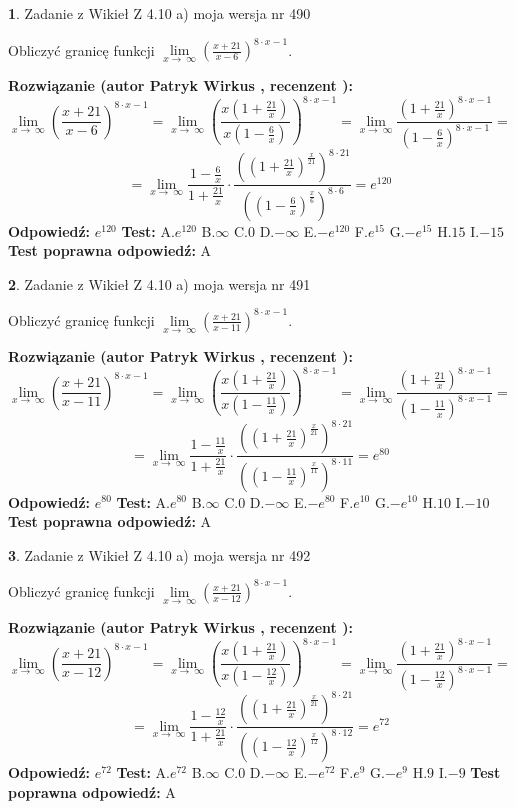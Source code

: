 \documentclass[12pt, a4paper]{article}
\theoremstyle{definition} %
\newtheorem{zad}{}
\newcommand{\zadStart}[1]{\begin{zad}#1\newline}
\newcommand{\zadStop}{\end{zad}}
\newcommand{\rozwStart}[2]{\noindent \textbf{Rozwiązanie (autor #1 , recenzent #2): }\newline}
\newcommand{\rozwStop}{\newline}
\newcommand{\odpStart}{\noindent \textbf{Odpowiedź:}\newline}
\newcommand{\odpStop}{\newline}
\newcommand{\testStart}{\noindent \textbf{Test:}\newline}
\newcommand{\testStop}{\newline}
\newcommand{\kluczStart}{\noindent \textbf{Test poprawna odpowiedź:}\newline}
\newcommand{\kluczStop}{\newline}
\begin{document}
\zadStart{Zadanie z Wikieł Z 4.10 a) moja wersja nr 490}

Obliczyć granicę funkcji  $\lim\limits_{x\to\ \infty}(\frac{x+21}{x-6})^{8\cdot x-1}$.
\zadStop
\rozwStart{Patryk Wirkus}{}
$$\lim\limits_{x\to\ \infty}(\frac{x+21}{x-6})^{8\cdot x-1} = \lim\limits_{x\to\ \infty}(\frac{x(1+\frac{21}{x})}{x(1-\frac{6}{x})})^{8\cdot x-1}=\lim\limits_{x\to\ \infty}\frac{(1+\frac{21}{x})^{8\cdot x-1}}{(1-\frac{6}{x})^{8\cdot x-1}}=$$
$$=\lim\limits_{x\to\ \infty}\frac{1-\frac{6}{x}}{1+\frac{21}{x}}\cdot\frac{((1+\frac{21}{x})^{\frac{x}{21}})^{8\cdot21}}{((1-\frac{6}{x})^{\frac{x}{6}})^{8\cdot6}}=e^{120}$$
\rozwStop
\odpStart
$e^{120}$
\odpStop
\testStart
A.$e^{120}$ B.$\infty$ C.$0$ D.$-\infty$ E.$-e^{120}$
F.$e^{15}$ G.$-e^{15}$
H.$15$
I.$-15$
\testStop
\kluczStart
A
\kluczStop



\zadStart{Zadanie z Wikieł Z 4.10 a) moja wersja nr 491}

Obliczyć granicę funkcji  $\lim\limits_{x\to\ \infty}(\frac{x+21}{x-11})^{8\cdot x-1}$.
\zadStop
\rozwStart{Patryk Wirkus}{}
$$\lim\limits_{x\to\ \infty}(\frac{x+21}{x-11})^{8\cdot x-1} = \lim\limits_{x\to\ \infty}(\frac{x(1+\frac{21}{x})}{x(1-\frac{11}{x})})^{8\cdot x-1}=\lim\limits_{x\to\ \infty}\frac{(1+\frac{21}{x})^{8\cdot x-1}}{(1-\frac{11}{x})^{8\cdot x-1}}=$$
$$=\lim\limits_{x\to\ \infty}\frac{1-\frac{11}{x}}{1+\frac{21}{x}}\cdot\frac{((1+\frac{21}{x})^{\frac{x}{21}})^{8\cdot21}}{((1-\frac{11}{x})^{\frac{x}{11}})^{8\cdot11}}=e^{80}$$
\rozwStop
\odpStart
$e^{80}$
\odpStop
\testStart
A.$e^{80}$ B.$\infty$ C.$0$ D.$-\infty$ E.$-e^{80}$
F.$e^{10}$ G.$-e^{10}$
H.$10$
I.$-10$
\testStop
\kluczStart
A
\kluczStop



\zadStart{Zadanie z Wikieł Z 4.10 a) moja wersja nr 492}

Obliczyć granicę funkcji  $\lim\limits_{x\to\ \infty}(\frac{x+21}{x-12})^{8\cdot x-1}$.
\zadStop
\rozwStart{Patryk Wirkus}{}
$$\lim\limits_{x\to\ \infty}(\frac{x+21}{x-12})^{8\cdot x-1} = \lim\limits_{x\to\ \infty}(\frac{x(1+\frac{21}{x})}{x(1-\frac{12}{x})})^{8\cdot x-1}=\lim\limits_{x\to\ \infty}\frac{(1+\frac{21}{x})^{8\cdot x-1}}{(1-\frac{12}{x})^{8\cdot x-1}}=$$
$$=\lim\limits_{x\to\ \infty}\frac{1-\frac{12}{x}}{1+\frac{21}{x}}\cdot\frac{((1+\frac{21}{x})^{\frac{x}{21}})^{8\cdot21}}{((1-\frac{12}{x})^{\frac{x}{12}})^{8\cdot12}}=e^{72}$$
\rozwStop
\odpStart
$e^{72}$
\odpStop
\testStart
A.$e^{72}$ B.$\infty$ C.$0$ D.$-\infty$ E.$-e^{72}$
F.$e^{9}$ G.$-e^{9}$
H.$9$
I.$-9$
\testStop
\kluczStart
A
\kluczStop
\end{document}
